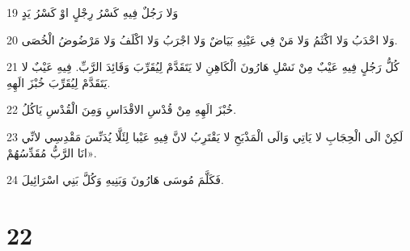 \par 19 وَلا رَجُلٌ فِيهِ كَسْرُ رِجْلٍ اوْ كَسْرُ يَدٍ
\par 20 وَلا احْدَبُ وَلا اكْثَمُ وَلا مَنْ فِي عَيْنِهِ بَيَاضٌ وَلا اجْرَبُ وَلا اكْلَفُ وَلا مَرْضُوضُ الْخُصَى.
\par 21 كُلُّ رَجُلٍ فِيهِ عَيْبٌ مِنْ نَسْلِ هَارُونَ الْكَاهِنِ لا يَتَقَدَّمْ لِيُقَرِّبَ وَقَائِدَ الرَّبِّ. فِيهِ عَيْبٌ لا يَتَقَدَّمْ لِيُقَرِّبَ خُبْزَ الَهِهِ.
\par 22 خُبْزَ الَهِهِ مِنْ قُدْسِ الاقْدَاسِ وَمِنَ الْقُدْسِ يَاكُلُ.
\par 23 لَكِنْ الَى الْحِجَابِ لا يَاتِي وَالَى الْمَذْبَحِ لا يَقْتَرِبُ لانَّ فِيهِ عَيْبا لِئَلَّا يُدَنِّسَ مَقْدِسِي لانِّي انَا الرَّبُّ مُقَدِّسُهُمْ».
\par 24 فَكَلَّمَ مُوسَى هَارُونَ وَبَنِيهِ وَكُلَّ بَنِي اسْرَائِيلَ.

\chapter{22}

